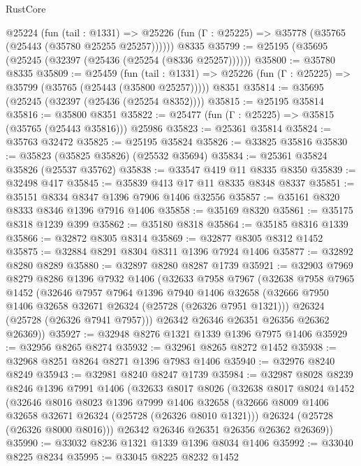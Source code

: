 \begin{lexlean}{RustCore}
\begin{coremodule}
    @25224
      (fun (tail : @1331) =>
      @25226 (fun (Γ : @25225) => @35778 (@35765 (@25443 (@35780 @25255 @25257))))))
    @8335
@35799 := @25195 (@35695 (@25245 (@32397 (@25436 (@25254 (@8336 @25257))))))
@35800 := @35780 @8335
@35809 := @25459
    (fun (tail : @1331) => @25226 (fun (Γ : @25225) => @35799 (@35765 (@25443 (@35800 @25257)))))
    @8351
@35814 := @35695 (@25245 (@32397 (@25436 (@25254 @8352))))
@35815 := @25195 @35814
@35816 := @35800 @8351
@35822 := @25477 (fun (Γ : @25225) => @35815 (@35765 (@25443 @35816))) @25986
@35823 := @25361 @35814
@35824 := @35763 @32472
@35825 := @25195 @35824
@35826 := @33825 @35816
@35830 := @35823 (@35825 @35826) (@25532 @35694)
@35834 := @25361 @35824 @35826 (@25537 @35762)
@35838 := @33547 @419 @11 @8335 @8350
@35839 := @32498 @417
@35845 := @35839 @413 @17 @11 @8335 @8348 @8337
@35851 := @35151 @8334 @8347 @1396 @7906 @1406 @32556
@35857 := @35161 @8320 @8333 @8346 @1396 @7916 @1406
@35858 := @35169 @8320
@35861 := @35175 @8318 @1239 @399
@35862 := @35180 @8318
@35864 := @35185 @8316 @1339
@35866 := @32872 @8305 @8314
@35869 := @32877 @8305 @8312 @1452
@35875 := @32884 @8291 @8304 @8311 @1396 @7924 @1406
@35877 := @32892 @8280 @8289
@35880 := @32897 @8280 @8287 @1739
@35921 := @32903
    @7969
    @8279
    @8286
    @1396
    @7932
    @1406
    (@32633
      @7958
      @7967
      (@32638
        @7958
        @7965
        @1452
        (@32646
          @7957
          @7964
          @1396
          @7940
          @1406
          @32658
          (@32666 @7950 @1406 @32658 @32671 @26324 (@25728 (@26326 @7951 @1321)))
          @26324
          (@25728 (@26326 @7941 @7957)))
        @26342
        @26346
        @26351
        @26356
        @26362
        @26369))
@35927 := @32948 @8276 @1321 @1339 @1396 @7975 @1406
@35929 := @32956 @8265 @8274
@35932 := @32961 @8265 @8272 @1452
@35938 := @32968 @8251 @8264 @8271 @1396 @7983 @1406
@35940 := @32976 @8240 @8249
@35943 := @32981 @8240 @8247 @1739
@35984 := @32987
    @8028
    @8239
    @8246
    @1396
    @7991
    @1406
    (@32633
      @8017
      @8026
      (@32638
        @8017
        @8024
        @1452
        (@32646
          @8016
          @8023
          @1396
          @7999
          @1406
          @32658
          (@32666 @8009 @1406 @32658 @32671 @26324 (@25728 (@26326 @8010 @1321)))
          @26324
          (@25728 (@26326 @8000 @8016)))
        @26342
        @26346
        @26351
        @26356
        @26362
        @26369))
@35990 := @33032 @8236 @1321 @1339 @1396 @8034 @1406
@35992 := @33040 @8225 @8234
@35995 := @33045 @8225 @8232 @1452

\end{coremodule}
\end{lexlean}

